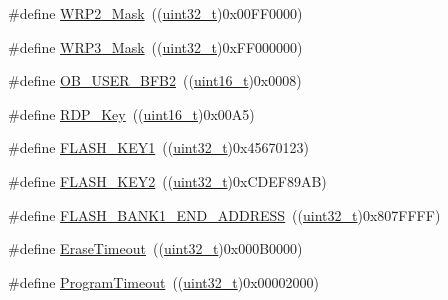 \begin{DoxyCompactItemize}
\item 
\#define \hyperlink{group___f_l_a_s_h___private___defines_ga4676f67c7be97a09eb1c6a5753ce0523}{W\+R\+P2\+\_\+\+Mask}~((\hyperlink{_p_e___types_8h_a33594304e786b158f3fb30289278f5af}{uint32\+\_\+t})0x00\+F\+F0000)
\item 
\#define \hyperlink{group___f_l_a_s_h___private___defines_ga649ce8b78520ca192b41aabe2daef035}{W\+R\+P3\+\_\+\+Mask}~((\hyperlink{_p_e___types_8h_a33594304e786b158f3fb30289278f5af}{uint32\+\_\+t})0x\+F\+F000000)
\item 
\#define \hyperlink{group___f_l_a_s_h___private___defines_ga5098bd938dadebbbdf9e628c84b2dcf0}{O\+B\+\_\+\+U\+S\+E\+R\+\_\+\+B\+F\+B2}~((\hyperlink{_p_e___types_8h_a1f1825b69244eb3ad2c7165ddc99c956}{uint16\+\_\+t})0x0008)
\item 
\#define \hyperlink{group___f_l_a_s_h___private___defines_ga34ec82060edcc9a18bf804b07dec5881}{R\+D\+P\+\_\+\+Key}~((\hyperlink{_p_e___types_8h_a1f1825b69244eb3ad2c7165ddc99c956}{uint16\+\_\+t})0x00\+A5)
\item 
\#define \hyperlink{group___f_l_a_s_h___private___defines_gafd77e7bf91765d891ce63e2f0084b019}{F\+L\+A\+S\+H\+\_\+\+K\+E\+Y1}~((\hyperlink{_p_e___types_8h_a33594304e786b158f3fb30289278f5af}{uint32\+\_\+t})0x45670123)
\item 
\#define \hyperlink{group___f_l_a_s_h___private___defines_gaee83d0f557e158da52f4a205db6b60a7}{F\+L\+A\+S\+H\+\_\+\+K\+E\+Y2}~((\hyperlink{_p_e___types_8h_a33594304e786b158f3fb30289278f5af}{uint32\+\_\+t})0x\+C\+D\+E\+F89\+A\+B)
\item 
\#define \hyperlink{group___f_l_a_s_h___private___defines_ga54cf78f1be63ba209709bf8f781ccd01}{F\+L\+A\+S\+H\+\_\+\+B\+A\+N\+K1\+\_\+\+E\+N\+D\+\_\+\+A\+D\+D\+R\+E\+SS}~((\hyperlink{_p_e___types_8h_a33594304e786b158f3fb30289278f5af}{uint32\+\_\+t})0x807\+F\+F\+F\+F)
\item 
\#define \hyperlink{group___f_l_a_s_h___private___defines_ga62b5515e9a29a487adcc30a88d082244}{Erase\+Timeout}~((\hyperlink{_p_e___types_8h_a33594304e786b158f3fb30289278f5af}{uint32\+\_\+t})0x000\+B0000)
\item 
\#define \hyperlink{group___f_l_a_s_h___private___defines_ga0794a43966b6084d28d13c651c739385}{Program\+Timeout}~((\hyperlink{_p_e___types_8h_a33594304e786b158f3fb30289278f5af}{uint32\+\_\+t})0x00002000)
\end{DoxyCompactItemize}
